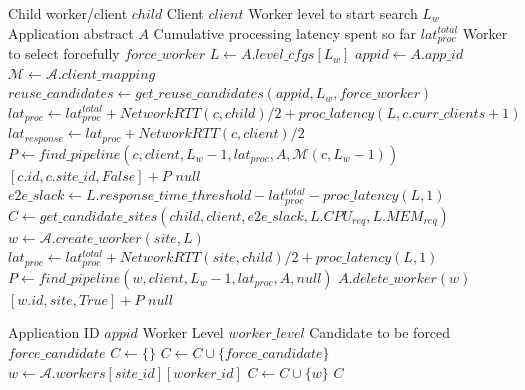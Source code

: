 \begin{algorithm}
\caption{$find\_pipeline$}
\begin{algorithmic}[1]
\Require Child worker/client $child$
\Require Client $client$
\Require Worker level to start search $L_w$
\Require Application abstract $A$
\Require Cumulative processing latency spent so far $lat_{proc}^{total}$
\Require Worker to select forcefully $force\_worker$
 
    \State \Return []
\EndIf
\State $L \gets A.level\_cfgs [L_w]$
\State $appid \gets A.app\_id$
\State $\mathcal{M} \gets \mathcal{A}.client\_mapping$ 
\State $reuse\_candidates \gets get\_reuse\_candidates \left( appid, L_w,  force\_worker \right)$
        \State $lat_{proc} \gets lat_{proc}^{total} + NetworkRTT \left( c, child \right)/2 + proc\_latency \left( L, c.curr\_clients+1\right)$
        \State $lat_{response} \gets lat_{proc} + NetworkRTT\left( c, client \right)/2 $
            \State $P \gets find\_pipeline \left( c, client, L_w - 1, lat_{proc}, A, \mathcal{M} \left( c, L_w -1 \right) \right)$
                \State \Return $[c.id, c.site\_id, False] + P$
            \EndIf
        \EndIf
    \EndIf
\EndFor
{}
    \State \Return $null$
\EndIf
\State $e2e\_slack \gets L.response\_time\_threshold - lat_{proc}^{total} - proc\_latency \left( L, 1 \right)$
\State $C \gets get\_candidate\_sites \left( child, client, e2e\_slack, L.CPU_{req}, L.MEM_{req} \right)$
    \State $w \gets \mathcal{A}.create\_worker \left( site, L\right)$
    \State $lat_{proc} \gets lat_{proc}^{total} + NetworkRTT \left( site, child \right)/2 + proc\_latency \left( L, 1\right)$
    \State $P \gets find\_pipeline \left( w, client, L_w - 1, lat_{proc}, A, null\right)$
        \State $A.delete\_worker \left( w \right)$
    \Else
        \State \Return $[w.id, site, True] + P$
    \EndIf
\EndFor
\State \Return $null$
\end{algorithmic}
\end{algorithm}

\begin{algorithm}
\caption{$get\_reuse\_candidates$}
\label{algo:get_reuse_candidates}
\begin{algorithmic}[1]
\Require Application ID $appid$
\Require Worker Level $worker\_level$
\Require Candidate to be forced $force\_candidate$
\State $C \gets \{\}$
    \State $C \gets C \cup \{ force\_candidate \}$
\Else
            \State $w \gets \mathcal{A}.workers[site\_id][worker\_id]$
                \State $C \gets C \cup \{ w \}$
            \EndIf
        \EndFor
    \EndFor
\EndIf
\State \Return $C$
\end{algorithmic}
\end{algorithm}

